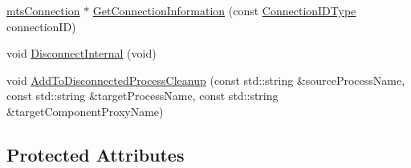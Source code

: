 \begin{DoxyCompactItemize}
\item 
\hyperlink{classmts_connection}{mts\+Connection} $\ast$ \hyperlink{classmts_manager_global_abd5b0c5b4f749c26628273f6adc92f9c}{Get\+Connection\+Information} (const \hyperlink{mts_forward_declarations_8h_ad3543bb11742e1766374ec96016d6547}{Connection\+I\+D\+Type} connection\+I\+D)
\item 
void \hyperlink{classmts_manager_global_ab3b98061820480cd58a6707adc549bd0}{Disconnect\+Internal} (void)
\item 
void \hyperlink{classmts_manager_global_a0404d7f1f8b8dba08ca0bc305251f851}{Add\+To\+Disconnected\+Process\+Cleanup} (const std\+::string \&source\+Process\+Name, const std\+::string \&target\+Process\+Name, const std\+::string \&target\+Component\+Proxy\+Name)
\end{DoxyCompactItemize}
\subsection*{Protected Attributes}

